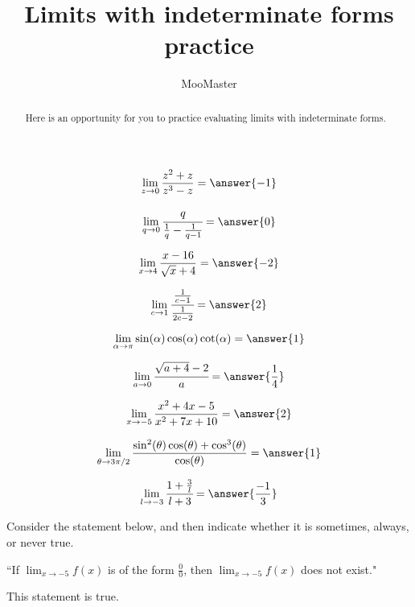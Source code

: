 \documentclass[handout]{ximera}
\title{Limits with indeterminate forms practice}
\author{MooMaster}
\begin{document}
\begin{abstract}
Here is an opportunity for you to practice evaluating limits with indeterminate forms. 
\end{abstract}
\maketitle

\begin{exercise}
\[\lim_{z \to 0} \frac{z^2+z}{z^3-z} = \answer{-1}\]
\end{exercise}

\begin{exercise}
\[\lim_{q \to 0} \cfrac{q}{\frac{1}{q} - \frac{1}{q-1}} = \answer{0}\]
\end{exercise}

\begin{exercise}
\[\lim_{x \to 4} \frac{x-16}{\sqrt{x} + 4} = \answer{-2}\]
\end{exercise}

\begin{exercise}
\[\lim_{c \to 1} \cfrac{\frac{1}{c-1}}{\frac{1}{2c-2}} = \answer{2}\]
\end{exercise}

\begin{exercise}
\[\lim_{\alpha \to \pi} \sin(\alpha) \cos(\alpha) \cot(\alpha) = \answer{1}\]
\end{exercise}

\begin{exercise}
\[\lim_{a \to 0} \cfrac{\sqrt{a+4} -2}{a} = \answer{\frac{1}{4}}\]
\end{exercise}

\begin{exercise}
\[\lim_{x \to -5} \frac{x^2 + 4x -5}{x^2 + 7x + 10} = \answer{2}\]
\end{exercise}

\begin{exercise}
\[\displaystyle\lim_{\theta \to 3\pi /2}\frac{\sin^2(\theta)\cos(\theta) + \cos^3(\theta)}{\cos(\theta)} = \answer{1}\]
\end{exercise}

\begin{exercise}
\[\lim_{l \to -3} \cfrac{1+\frac{3}{l}}{l+3} = \answer{\frac{-1}{3}}\]
\end{exercise}

\begin{exercise}

Consider the statement below, and then indicate whether it is sometimes, always, or never true.

\begin{center} ``If $\displaystyle\lim_{x \to -5} f(x)$ is of the form $\frac{0}{0}$, then $\displaystyle\lim_{x\to -5} f(x)$ does not exist." \end{center}

This statement is  true.

\end{exercise}
\end{document}
